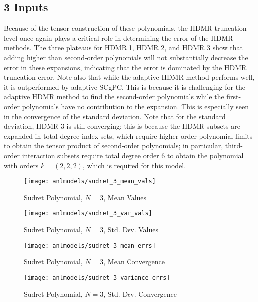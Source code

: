 \subsection{3 Inputs}
Because of the tensor construction of these polynomials, the HDMR truncation level once again plays a critical
role in determining the error of the HDMR methods.  The three plateaus for HDMR 1, HDMR 2, and HDMR 3 show
that adding higher than second-order polynomials will not substantially decrease the error in these
expansions, indicating that the error is dominated by the HDMR truncation error.  Note also that while the
adaptive HDMR method performs well, it is outperformed by adaptive SCgPC.  This is because it is challenging
for the adaptive HDMR method to find the second-order polynomials while the first-order polynomials have no
contribution to the expansion.  This is especially seen in the convergence of the standard deviation.  Note
that for the standard deviation, HDMR 3 is still converging; this is because the HDMR subsets are expanded in
total degree index sets, which require higher-order polynomial limits to obtain the tensor product of
second-order polynomials; in particular, third-order interaction subsets require total degree order 6 to
obtain the polynomial with orders $k=(2,2,2)$, which is required for this model.
\begin{figure}[H]
  \centering
  \texttt{[image: anlmodels/sudret\_3\_mean\_vals]}
  \caption{Sudret Polynomial, $N=3$, Mean Values}
  \label{fig:sudretpoly mean values 3}
\end{figure}
\begin{figure}[H]
  \centering
  \texttt{[image: anlmodels/sudret\_3\_var\_vals]}
  \caption{Sudret Polynomial, $N=3$, Std. Dev. Values}
  \label{fig:sudretpoly var values 3}
\end{figure}

\begin{figure}[H]
  \centering
  \texttt{[image: anlmodels/sudret\_3\_mean\_errs]}
  \caption{Sudret Polynomial, $N=3$, Mean Convergence}
  \label{fig:sudretpoly mean errors 3}
\end{figure}
\begin{figure}[H]
  \centering
  \texttt{[image: anlmodels/sudret\_3\_variance\_errs]}
  \caption{Sudret Polynomial, $N=3$, Std. Dev. Convergence}
  \label{fig:sudretpoly var errors 3}
\end{figure}

